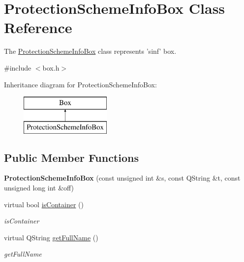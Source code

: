 \hypertarget{class_protection_scheme_info_box}{\section{Protection\-Scheme\-Info\-Box Class Reference}
\label{class_protection_scheme_info_box}
}


The \hyperlink{class_protection_scheme_info_box}{Protection\-Scheme\-Info\-Box} class represents 'sinf' box.  




{\ttfamily \#include $<$box.\-h$>$}

Inheritance diagram for Protection\-Scheme\-Info\-Box\-:\begin{figure}[H]
\begin{center}
\leavevmode
\includegraphics[height=2.000000cm]{class_protection_scheme_info_box}
\end{center}
\end{figure}
\subsection*{Public Member Functions}
\begin{DoxyCompactItemize}
\item 
\hypertarget{class_protection_scheme_info_box_a7a864c66107f1ab8d0c28a097b0e634e}{{\bfseries Protection\-Scheme\-Info\-Box} (const unsigned int \&s, const Q\-String \&t, const unsigned long int \&off)}\label{class_protection_scheme_info_box_a7a864c66107f1ab8d0c28a097b0e634e}

\item 
virtual bool \hyperlink{class_protection_scheme_info_box_ad5b64db8fc90bcc8cdbfc747ca09e48e}{is\-Container} ()
\begin{DoxyCompactList}\small\item\em is\-Container \end{DoxyCompactList}\item 
virtual Q\-String \hyperlink{class_protection_scheme_info_box_a322ef8cac44eae717e95c395d80b9afe}{get\-Full\-Name} ()
\begin{DoxyCompactList}\small\item\em get\-Full\-Name \end{DoxyCompactList}\end{DoxyCompactItemize}
